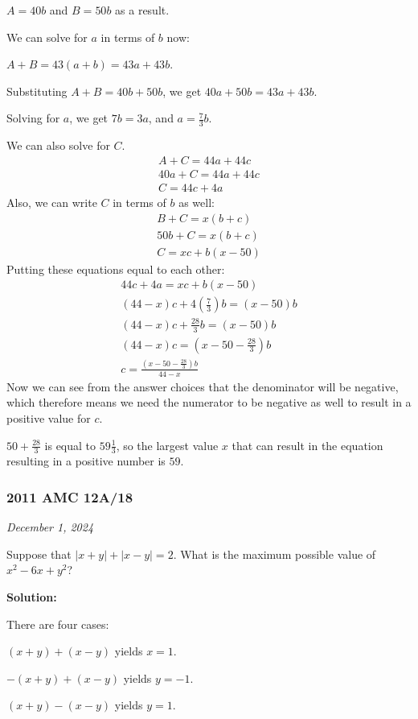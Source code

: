 \documentclass[../mathproblems.tex]{subfiles}
\begin{document}
$A=40b$ and $B=50b$ as a result.

We can solve for $a$ in terms of $b$ now:

$A+B=43(a+b) = 43a + 43b$.

Substituting $A+B=40b+50b$, we get $40a+50b=43a+43b$.

Solving for $a$, we get $7b=3a$, and $a=\frac{7}{3}b$.

We can also solve for $C$.
\begin{align*} A+C=44a+44c\\ 40a+C = 44a+44c\\ C = 44c+4a \end{align*}
Also, we can write $C$ in terms of $b$ as well:
\begin{align*} B+C=x(b+c)\\ 50b+C=x(b+c)\\ C = xc+b(x-50) \end{align*}
Putting these equations equal to each other:
\begin{align*} 44c+4a=xc+b(x-50)\\ (44-x)c+4\left(\frac{7}{3}\right)b=(x-50)b\\ (44-x)c+\frac{28}{3}b=(x-50)b\\ (44-x)c=\left(x-50-\frac{28}{3}\right)b\\ c = \frac{\left(x-50-\frac{28}{3}\right)b}{44-x} \end{align*}
Now we can see from the answer choices that the denominator will be negative, which therefore means we need the numerator to be negative as well to result in a positive value for $c$.

$50+\frac{28}{3}$ is equal to $59\frac{1}{3}$, so the largest value $x$ that can result in the equation resulting in a positive number is $\boxed{59}$.

\noindent\hrulefill
\subsubsection*{2011 AMC 12A/18} 
\textit{December 1, 2024}

Suppose that $\left|x+y\right|+\left|x-y\right|=2$. What is the maximum possible value of $x^2-6x+y^2$?

\textbf{Solution:}

There are four cases:

$(x+y)+(x-y)$ yields $x=1$.

$-(x+y)+(x-y)$ yields $y=-1$.

$(x+y)-(x-y)$ yields $y=1$.
\end{document}
